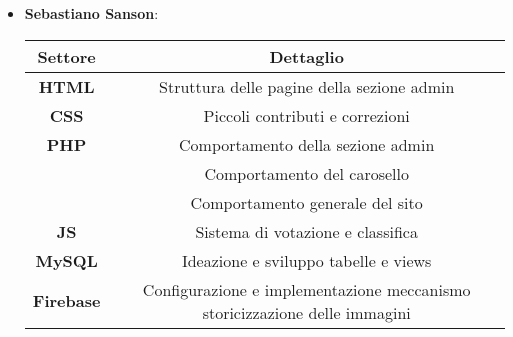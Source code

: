 \begin{itemize}
    \clearpage

    \item \textbf{Sebastiano Sanson}: 
    \begin{center}
        \begin{tabular}{| c | c |}
            \hline
            \textbf{Settore} & \textbf{Dettaglio}  \\ [0.5ex]
            \hline \hline
            \textbf{HTML} & Struttura delle pagine della sezione admin \\
            \hline
            \textbf{CSS} & Piccoli contributi e correzioni \\
            \hline
            \textbf{PHP} & Comportamento della sezione admin \\
            & Comportamento del carosello \\
            & Comportamento generale del sito \\
            \hline
            \textbf{JS} & Sistema di votazione e classifica \\
            \hline
            \textbf{MySQL} & Ideazione e sviluppo tabelle e views \\
            \hline
            \textbf{Firebase} & Configurazione e implementazione meccanismo storicizzazione delle immagini \\
            \hline
        \end{tabular}
    \end{center}
\end{itemize}